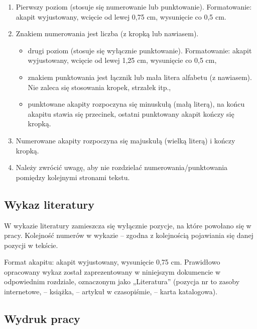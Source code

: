 \documentclass[12pt,twoside]{article}
\begin{document}
\begin{enumerate}[label=\arabic*), leftmargin=1.25cm]
	\item Pierwszy poziom (stosuje się numerowanie lub punktowanie). Formatowanie:
	akapit wyjustowany, wcięcie od lewej 0,75 cm, wysunięcie co 0,5 cm.
	\item Znakiem numerowania jest liczba (z kropką lub nawiasem).
		\begin{itemize}[label=-,labelsep=0.4cm,leftmargin=0.6cm]
			\item drugi poziom (stosuje się wyłącznie punktowanie). Formatowanie: akapit
			wyjustowany, wcięcie od lewej 1,25 cm, wysunięcie co 0,5 cm,
			\item znakiem punktowania jest łącznik lub mała litera alfabetu (z nawiasem). Nie
			zaleca się stosowania kropek, strzałek itp.,
			\item punktowane akapity rozpoczyna się minuskułą (małą literą), na końcu akapitu
			stawia się przecinek, ostatni punktowany akapit kończy się kropką.
		\end{itemize}
	\item Numerowane akapity rozpoczyna się majuskułą (wielką literą) i kończy kropką.
	\item Należy zwrócić uwagę, aby nie rozdzielać numerowania/punktowania pomiędzy
	kolejnymi stronami tekstu.
\end{enumerate}


\subsection{Wykaz literatury}

W wykazie literatury zamieszcza się wyłącznie pozycje, na które powołano się
w pracy. Kolejność numerów w wykazie – zgodna z kolejnością pojawiania się danej
pozycji w tekście.

Format akapitu: akapit wyjustowany, wysunięcie 0,75 cm. Prawidłowo opracowany
wykaz został zaprezentowany w niniejszym dokumencie w odpowiednim rozdziale, oznaczonym jako „Literatura”  (pozycja nr \cite{str} to zasoby internetowe,
\cite{Jakubczyk1997} – książka, \cite{Barski2011} – artykuł w czasopiśmie, \cite{dokum} – karta katalogowa).

{\subsection{Wydruk pracy}}
\end{document}
